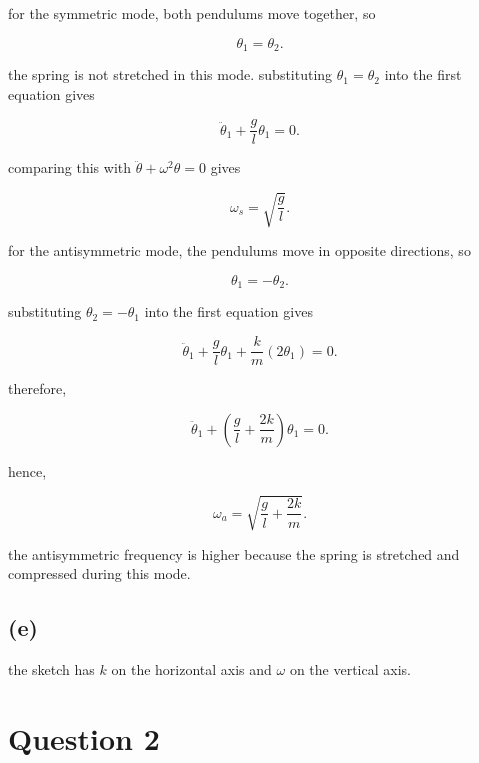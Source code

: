 \documentclass{article}
\begin{document}
for the symmetric mode, both pendulums move together, so

\[
\theta_1=\theta_2.
\]

the spring is not stretched in this mode. substituting $\theta_1=\theta_2$ into the first equation gives

\[
\ddot{\theta}_1+\frac{g}{l}\theta_1=0.
\]

comparing this with $\ddot{\theta}+\omega^2\theta=0$ gives

\[
\boxed{\omega_s=\sqrt{\frac{g}{l}}}.
\]

for the antisymmetric mode, the pendulums move in opposite directions, so

\[
\theta_1=-\theta_2.
\]

substituting $\theta_2=-\theta_1$ into the first equation gives

\[
\ddot{\theta}_1+\frac{g}{l}\theta_1
+\frac{k}{m}(2\theta_1)=0.
\]

therefore,

\[
\ddot{\theta}_1+
\left(\frac{g}{l}+\frac{2k}{m}\right)\theta_1=0.
\]

hence,

\[
\boxed{\omega_a=\sqrt{\frac{g}{l}+\frac{2k}{m}}}.
\]

the antisymmetric frequency is higher because the spring is stretched and compressed during this mode.

\subsection*{(e)}

the sketch has $k$ on the horizontal axis and $\omega$ on the vertical axis.

\begin{center}
\end{center}

\section*{Question 2}
\end{document}
